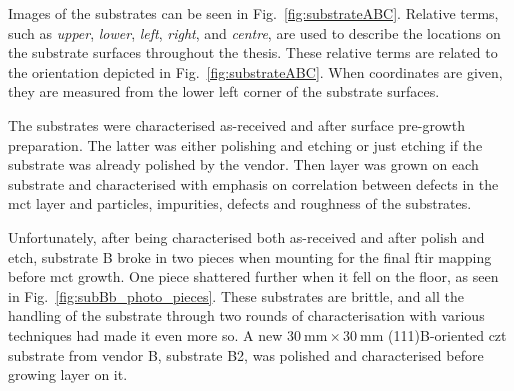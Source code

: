 Images of the substrates can be seen in Fig.~\ref{fig:substrateABC}. Relative terms, such as \emph{upper}, \emph{lower}, \emph{left}, \emph{right}, and \emph{centre}, are used to describe the locations on the substrate surfaces throughout the thesis. These relative terms are related to the orientation depicted in Fig.~\ref{fig:substrateABC}. When coordinates are given, they are measured from the lower left corner of the substrate surfaces. %

The substrates were characterised as-received and after surface pre-growth preparation. The latter was either polishing and etching or just etching if the substrate was already polished by the vendor. Then  layer was grown on each substrate and characterised with emphasis on correlation between defects in the \ac{mct} layer and particles, impurities, defects and roughness of the substrates.

Unfortunately, after being characterised both as-received and after polish and etch, substrate B broke in two pieces when mounting for the final \ac{ftir} mapping before \ac{mct} growth. One piece shattered further when it fell on the floor, as seen in Fig.~\ref{fig:subBb_photo_pieces}. These substrates are brittle, and all the handling of the substrate through two rounds of characterisation with various techniques had made it even more so. A new $\SI{30}{\milli\metre}\times\SI{30}{\milli\metre}$ (111)B-oriented \ac{czt} substrate from vendor B, substrate B2, was polished and characterised before growing  layer on it.

